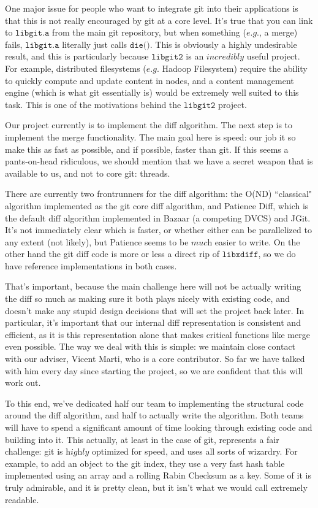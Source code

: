 \documentclass[a4paper]{article}
\begin{document}
One major issue for people who want to integrate git into their applications is that this is not really encouraged by git at a core level. It's true that you can link to $\texttt{libgit.a}$ from the main git repository, but when something ($\textit{e.g.}$, a merge) fails, $\texttt{libgit.a}$ literally just calls $\texttt{die()}$. This is obviously a highly undesirable result, and this is particularly because $\texttt{libgit2}$ is an $\textit{incredibly}$ useful project. For example, distributed filesystems ($\textit{e.g.}$ Hadoop Filesystem) require the ability to quickly compute and update content in nodes, and a content management engine (which is what git essentially is) would be extremely well suited to this task. This is one of the motivations behind the $\texttt{libgit2}$ project.

Our project currently is to implement the diff algorithm. The next step is to implement the merge functionality. The main goal here is speed: our job it so make this as fast as possible, and if possible, faster than git. If this seems a pants-on-head ridiculous, we should mention that we have a secret weapon that is available to us, and not to core git: threads.

There are currently two frontrunners for the diff algorithm: the O(ND) ``classical" algorithm implemented as the git core diff algorithm, and Patience Diff, which is the default diff algorithm implemented in Bazaar (a competing DVCS) and JGit. It's not immediately clear which is faster, or whether either can be parallelized to any extent (not likely), but Patience seems to be $\textit{much}$ easier to write. On the other hand the git diff code is more or less a direct rip of $\texttt{libxdiff}$, so we do have reference implementations in both cases.

That's important, because the main challenge here will not be actually writing the diff so much as making sure it both plays nicely with existing code, and doesn't make any stupid design decisions that will set the project back later. In particular, it's important that our internal diff representation is consistent and efficient, as it is this representation alone that makes critical functions like merge even possible. The way we deal with this is simple: we maintain close contact with our adviser, Vicent Marti, who is a core contributor. So far we have talked with him every day since starting the project, so we are confident that this will work out.

To this end, we've dedicated half our team to implementing the structural code around the diff algorithm, and half to actually write the algorithm. Both teams will have to spend a significant amount of time looking through existing code and building into it. This actually, at least in the case of git, represents a fair challenge: git is $\textit{highly}$ optimized for speed, and uses all sorts of wizardry. For example, to add an object to the git index, they use a very fast hash table implemented using an array and a rolling Rabin Checksum as a key. Some of it is truly admirable, and it is pretty clean, but it isn't what we would call extremely readable.
\end{document}
